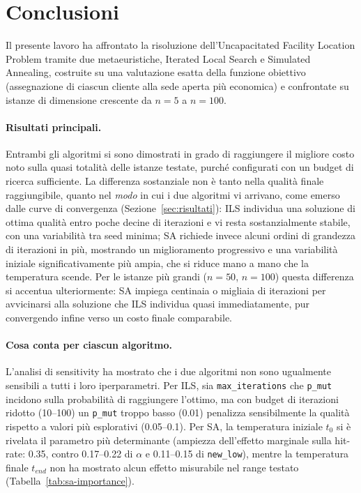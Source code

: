 \documentclass[11pt,a4paper]{article}
\begin{document}
\section{Conclusioni}

Il presente lavoro ha affrontato la risoluzione dell'Uncapacitated Facility
Location Problem tramite due metaeuristiche, Iterated Local Search e
Simulated Annealing, costruite su una valutazione esatta della funzione
obiettivo (assegnazione di ciascun cliente alla sede aperta più economica) e
confrontate su istanze di dimensione crescente da $n=5$ a $n=100$.

\paragraph{Risultati principali.} Entrambi gli algoritmi si sono dimostrati
in grado di raggiungere il migliore costo noto sulla
quasi totalità delle istanze testate, purché configurati con un budget di
ricerca sufficiente. La differenza sostanziale non è tanto nella qualità
finale raggiungibile, quanto nel \emph{modo} in cui i due algoritmi vi
arrivano, come emerso dalle curve di convergenza (Sezione~\ref{sec:risultati}):
ILS individua una soluzione di ottima qualità entro poche decine di
iterazioni e vi resta sostanzialmente stabile, con una variabilità tra seed
minima; SA richiede invece alcuni ordini di grandezza di iterazioni in più,
mostrando un miglioramento progressivo e una variabilità iniziale
significativamente più ampia, che si riduce mano a mano che la temperatura
scende. Per le istanze più grandi ($n=50$, $n=100$) questa differenza si
accentua ulteriormente: SA impiega centinaia o migliaia di iterazioni per
avvicinarsi alla soluzione che ILS individua quasi immediatamente, pur
convergendo infine verso un costo finale comparabile.

\paragraph{Cosa conta per ciascun algoritmo.} L'analisi di sensitivity ha
mostrato che i due algoritmi non sono ugualmente sensibili a tutti i loro
iperparametri. Per ILS, sia \texttt{max\_iterations} che \texttt{p\_mut}
incidono sulla probabilità di raggiungere l'ottimo, ma con budget di
iterazioni ridotto (10--100) un \texttt{p\_mut} troppo basso (0.01) penalizza
sensibilmente la qualità rispetto a valori più esplorativi (0.05--0.1). Per
SA, la temperatura iniziale $t_0$ si è rivelata il parametro più
determinante (ampiezza dell'effetto marginale sulla hit-rate: 0.35, contro
0.17--0.22 di $\alpha$ e 0.11--0.15 di \texttt{new\_low}), mentre la
temperatura finale $t_{end}$ non ha mostrato alcun effetto misurabile nel
range testato (Tabella~\ref{tab:sa-importance}).
\end{document}
